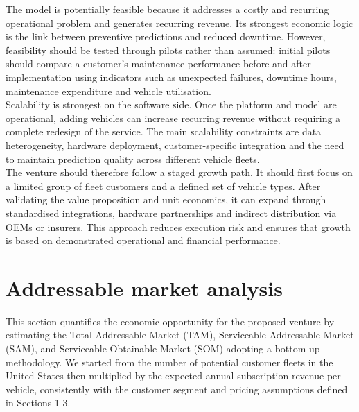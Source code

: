 \documentclass[11pt,a4paper]{article}
\begin{document}
The model is potentially feasible because it addresses a costly and recurring operational problem and generates recurring revenue. Its strongest economic logic is the link between preventive predictions and reduced downtime. However, feasibility should be tested through pilots rather than assumed: initial pilots should compare a customer’s maintenance performance before and after implementation using indicators such as unexpected failures, downtime hours, maintenance expenditure and vehicle utilisation.
\\
Scalability is strongest on the software side. Once the platform and model are operational, adding vehicles can increase recurring revenue without requiring a complete redesign of the service. The main scalability constraints are data heterogeneity, hardware deployment, customer-specific integration and the need to maintain prediction quality across different vehicle fleets.
\\
The venture should therefore follow a staged growth path. It should first focus on a limited group of fleet customers and a defined set of vehicle types. After validating the value proposition and unit economics, it can expand through standardised integrations, hardware partnerships and indirect distribution via OEMs or insurers. This approach reduces execution risk and ensures that growth is based on demonstrated operational and financial performance.
\section{Addressable market analysis}
\noindent This section quantifies the economic opportunity for the proposed venture by estimating the Total Addressable Market (TAM), Serviceable Addressable Market (SAM), and Serviceable Obtainable Market (SOM) adopting a bottom-up methodology. We started from the number of potential customer fleets in the United States then multiplied by the expected annual subscription revenue per vehicle, consistently with the customer segment and pricing assumptions defined in Sections 1-3.
\end{document}
